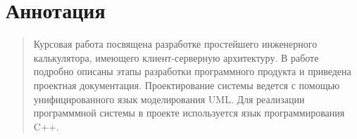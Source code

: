 \setcounter{page}{2}

\vspace*{1cm}
\section*{Аннотация}

\begin{quote} 
\hspace*{\parindent}
Курсовая работа посвящена разработке простейшего 
инженерного калькулятора, имеющего клиент-серверную архитектуру. 
В работе подробно описаны этапы разработки программного продукта 
и приведена проектная документация. Проектирование системы 
ведется с помощью унифицированного язык моделирования UML.
Для реализации программмной системы в проекте используется 
язык программирования C++.

\end{quote}

\vspace*{1cm}

\tableofcontents

\newpage
\endinput
